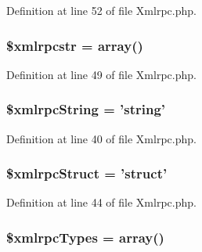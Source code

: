 Definition at line 52 of file Xmlrpc.\-php.

\hypertarget{class_c_i___xmlrpc_a89bbdd6a565dd3af2378b44fc5f156a0}{
\subsubsection[{\$xmlrpcstr}]{\setlength{\rightskip}{0pt plus 5cm}\$xmlrpcstr = array()}}\label{class_c_i___xmlrpc_a89bbdd6a565dd3af2378b44fc5f156a0}


Definition at line 49 of file Xmlrpc.\-php.

\hypertarget{class_c_i___xmlrpc_a69f8b2c87014597d1f5509ec934ceeea}{
\subsubsection[{\$xmlrpc\-String}]{\setlength{\rightskip}{0pt plus 5cm}\$xmlrpc\-String = 'string'}}\label{class_c_i___xmlrpc_a69f8b2c87014597d1f5509ec934ceeea}


Definition at line 40 of file Xmlrpc.\-php.

\hypertarget{class_c_i___xmlrpc_a9a499285050ed5c867eec71854231f01}{
\subsubsection[{\$xmlrpc\-Struct}]{\setlength{\rightskip}{0pt plus 5cm}\$xmlrpc\-Struct = 'struct'}}\label{class_c_i___xmlrpc_a9a499285050ed5c867eec71854231f01}


Definition at line 44 of file Xmlrpc.\-php.

\hypertarget{class_c_i___xmlrpc_a2b937e1ca5ee8495f0251a74222cec64}{
\subsubsection[{\$xmlrpc\-Types}]{\setlength{\rightskip}{0pt plus 5cm}\$xmlrpc\-Types = array()}}\label{class_c_i___xmlrpc_a2b937e1ca5ee8495f0251a74222cec64}


